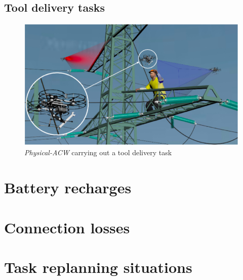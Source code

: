 \subsection{Tool delivery tasks}
\label{subsec:ToolDeliveryTasks}
\begin{figure}[htbp]
    \centering
    \includegraphics[width=1\linewidth]
    {ProblemFormulation/figures/deliver_task.png}
    \caption{\textit{Physical-ACW} carrying out a tool delivery task}
    \label{fig:deliver_task}
\end{figure}

\section{Battery recharges}
\label{sec:BatteryRecharges}

\section{Connection losses}
\label{sec:ConnectionLosses}

\section{Task replanning situations}
\label{sec:TaskReplanningSituations}

